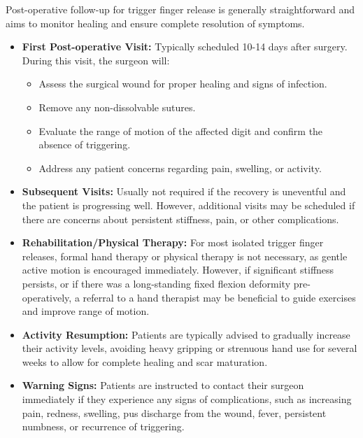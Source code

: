 Post-operative follow-up for trigger finger release is generally straightforward and aims to monitor healing and ensure complete resolution of symptoms. 

\begin{itemize}
  \item \textbf{First Post-operative Visit:} Typically scheduled 10-14 days after surgery. During this visit, the surgeon will:
    \begin{itemize}
      \item Assess the surgical wound for proper healing and signs of infection.
      \item Remove any non-dissolvable sutures.
      \item Evaluate the range of motion of the affected digit and confirm the absence of triggering.
      \item Address any patient concerns regarding pain, swelling, or activity.
    \end{itemize}
  
  \item \textbf{Subsequent Visits:} Usually not required if the recovery is uneventful and the patient is progressing well. However, additional visits may be scheduled if there are concerns about persistent stiffness, pain, or other complications.
  
  \item \textbf{Rehabilitation/Physical Therapy:} For most isolated trigger finger releases, formal hand therapy or physical therapy is not necessary, as gentle active motion is encouraged immediately. However, if significant stiffness persists, or if there was a long-standing fixed flexion deformity pre-operatively, a referral to a hand therapist may be beneficial to guide exercises and improve range of motion.
  
  \item \textbf{Activity Resumption:} Patients are typically advised to gradually increase their activity levels, avoiding heavy gripping or strenuous hand use for several weeks to allow for complete healing and scar maturation.
  
  \item \textbf{Warning Signs:} Patients are instructed to contact their surgeon immediately if they experience any signs of complications, such as increasing pain, redness, swelling, pus discharge from the wound, fever, persistent numbness, or recurrence of triggering.
\end{itemize}

